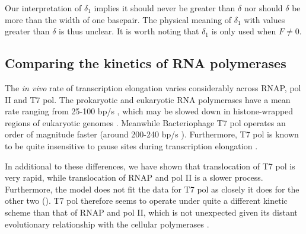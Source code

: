 \documentclass[10pt,letterpaper]{article}
\begin{document}
Our interpretation of $\delta_1$ implies it should never be greater than $\delta$ nor should $\delta$ be more than the width of one basepair. The physical meaning of $\delta_1$ with values greater than $\delta$ is thus unclear. It is worth noting that $\delta_1$ is only used when $F \neq 0$. \\





\subsection*{Comparing the kinetics of RNA polymerases} 




The {\it in vivo} rate of transcription elongation varies considerably across  RNAP, pol II and T7 pol. The prokaryotic and eukaryotic RNA polymerases have a mean rate ranging from 25-100 bp/s \cite{iost1992bacteriophage, vogel1994rna, ryals1982temperature, tennyson1995human, darzacq2007vivo, mason2005distinction, kainov2004packaging}, which may be slowed down in histone-wrapped regions of eukaryotic genomes \cite{hodges2009nucleosomal}. Meanwhile Bacteriophage T7 pol operates an order of magnitude faster (around 200-240 bp/s \cite{iost1992bacteriophage, makarova1995transcribing}). Furthermore, T7 pol is known to be quite insensitive to pause sites during transcription elongation \cite{skinner2004promoter, thomen2008t7}. 



In additional to these differences, we have shown that translocation of T7 pol is very rapid, while translocation of RNAP and pol II is a slower process. Furthermore, the model does not fit the data  for T7 pol as closely it does for the other two ().  T7 pol therefore seems to operate under quite a different kinetic scheme than that of RNAP and pol II, which is not unexpected given its distant evolutionary relationship with the cellular polymerases \cite{sousa1993crystal}. \par
\end{document}
